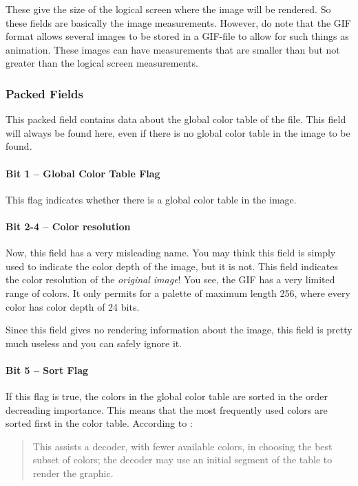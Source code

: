   These give the size of the logical screen where the image will be
  rendered. So these fields are basically the image
  measurements. However, do note that the GIF format allows several
  images to be stored in a GIF-file to allow for such things as
  animation. These images can have measurements that are smaller than
  but not greater than the logical screen measurements.

  \subsubsection{Packed Fields}

  This packed field contains data about the global color table of the
  file. This field will always be found here, even if there is no
  global color table in the image to be found.

  \paragraph{Bit 1 --  Global Color Table Flag}

  This flag indicates whether there is a global color table in the
  image.

  \paragraph{Bit 2-4 -- Color resolution}

  Now, this field has a very misleading name. You may think this field
  is simply used to indicate the color depth of the image, but it is
  not. This field indicates the color resolution of the
  \textit{original image}! You see, the GIF has a very limited range
  of colors. It only permits for a palette of maximum length 256,
  where every color has color depth of 24 bits.

  Since this field gives no rendering information about the image,
  this field is pretty much useless and you can safely ignore it.

  \paragraph{Bit 5 -- Sort Flag}

  If this flag is true, the colors in the global color table are
  sorted in the order decreading importance. This means that the most
  frequently used colors are sorted first in the color
  table. According to \cite{gif89a}:

  \begin{quote}
    This assists a decoder, with fewer available colors, in choosing
    the best subset of colors; the decoder may use an initial segment
    of the table to render the graphic.
  \end{quote}

